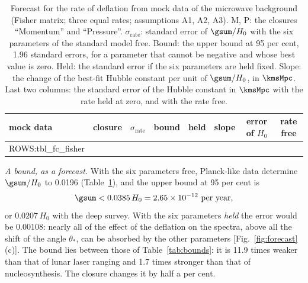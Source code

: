 \begin{table}
\caption{\label{tab:fisher}Forecast for the rate of deflation from mock data of the microwave
background (Fisher matrix; three equal rates; assumptions A1, A2, A3). M, P: the closures
``Momentum'' and ``Pressure''. $\sigma_{\mathrm{rate}}$:
standard error of $\gsum/H_0$ with the six parameters of the standard model free. Bound: the upper
bound at 95 per cent, 1.96 standard errors, for a parameter that cannot be negative and whose best
value is zero. Held: the standard error if the six parameters are held fixed. Slope: the change of the
best-fit Hubble constant per unit of $\gsum/H_0$, in $\kmsMpc$. Last two columns: the standard error
of the Hubble constant in $\kmsMpc$ with the rate held at zero, and with the rate free.}
\begin{ruledtabular}
\begin{tabular}{llcccccc}
mock data & closure & $\sigma_{\mathrm{rate}}$ & bound & held & slope & error of $H_0$ & rate free \\
\hline
{{ROWS:tbl_fc_fisher}}
\end{tabular}
\end{ruledtabular}
\end{table}

\emph{A bound, as a forecast.} With the six parameters free, Planck-like data determine $\gsum/H_0$
to 0.0196 (Table~\ref{tab:fisher}), and the upper bound at 95 per cent is
\begin{equation}
\gsum<0.0385\,H_0=2.65\times10^{-12}\ \text{per year},
\end{equation}
or $0.0207\,H_0$ with the deep survey. With the six parameters \emph{held} the error would be
0.00108: nearly all of the effect of the deflation on the spectra, above all the shift of the angle
$\theta_*$, can be absorbed by the other parameters [Fig.~\ref{fig:forecast}(c)]. The bound lies
between those of Table~\ref{tab:bounds}: it is 11.9 times weaker than that of lunar laser ranging and
1.7 times stronger than that of nucleosynthesis. The closure changes it by half a per cent.

